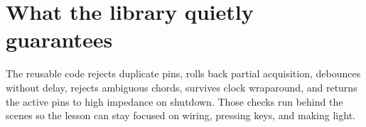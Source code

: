 \documentclass[11pt]{article}
\begin{document}
\section{What the library quietly guarantees}

The reusable code rejects duplicate pins, rolls back partial acquisition,
debounces without delay, rejects ambiguous chords, survives clock wraparound,
and returns the active pins to high impedance on shutdown. Those checks run
behind the scenes so the lesson can stay focused on wiring, pressing keys, and
making light.
\end{document}

